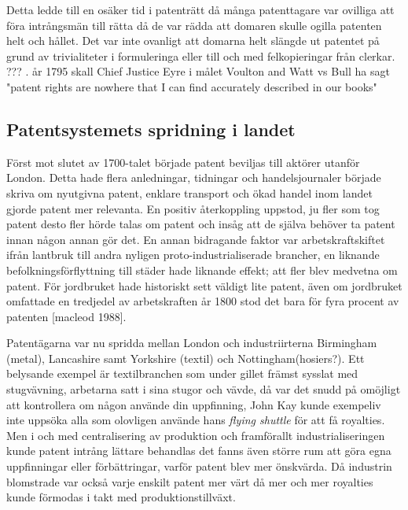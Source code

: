 Detta ledde till en osäker tid i patenträtt då många patenttagare var ovilliga att föra intrångsmän till rätta då de var rädda att domaren skulle ogilla patenten helt och hållet. Det var inte ovanligt att domarna helt slängde ut patentet på grund av trivialiteter i formuleringa eller till och med felkopieringar från clerkar. ??? . år 1795 skall Chief Justice Eyre i målet Voulton and Watt vs Bull ha sagt "patent rights are nowhere 
that I can find accurately described in our books"


\subsection{Patentsystemets spridning i landet} %
\label{sub:patentsystemets_spridning_i_landet}

Först mot slutet av 1700-talet började patent beviljas till aktörer utanför London. Detta hade flera anledningar, tidningar och handelsjournaler började skriva om nyutgivna patent, enklare transport och ökad handel inom landet gjorde patent mer relevanta. En positiv återkoppling uppstod, ju fler som tog patent desto fler hörde talas om patent och insåg att de själva behöver ta patent innan någon annan gör det. En annan bidragande faktor var arbetskraftskiftet ifrån lantbruk till andra nyligen proto-industrialiserade brancher, en liknande befolkningsförflyttning till städer hade liknande effekt; att fler blev medvetna om patent. För jordbruket hade historiskt sett väldigt lite patent, även om jordbruket omfattade en tredjedel av arbetskraften år 1800 stod det bara för fyra procent av patenten [macleod 1988].

Patentägarna var nu spridda mellan London och industriirterna Birmingham (metal), Lancashire samt Yorkshire (textil) och Nottingham(hosiers?). Ett belysande exempel är textilbranchen som under gillet främst sysslat med stugvävning, arbetarna satt i sina stugor och vävde, då var det snudd på omöjligt att kontrollera om någon använde din uppfinning, John Kay kunde exempeliv inte uppsöka alla som olovligen använde hans \emph{flying shuttle} för att få royalties. Men i och med centralisering av produktion och framförallt industrialiseringen kunde patent intrång lättare behandlas det fanns även större rum att göra egna uppfinningar eller förbättringar, varför patent blev mer önskvärda. Då industrin blomstrade var också varje enskilt patent mer värt då mer och mer royalties kunde förmodas i takt med produktionstillväxt.

